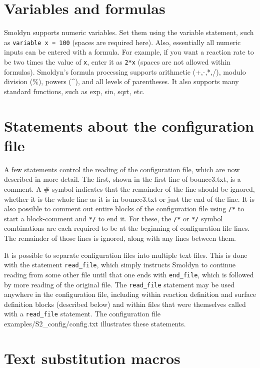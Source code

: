 \documentclass {scrbook}
\newcommand {\ttt} {\texttt}
\begin{document}
\section{Variables and formulas}

Smoldyn supports numeric variables. Set them using the variable statement, such as \ttt{variable x = 100} (spaces are required here). Also, essentially all numeric inputs can be entered with a formula. For example, if you want a reaction rate to be two times the value of \ttt{x}, enter it as \ttt{2*x} (spaces are not allowed within formulas). Smoldyn's formula processing supports arithmetic (+,-,*,/), modulo division (\%), powers (\^{}), and all levels of parentheses. It also supports many standard functions, such as exp, sin, sqrt, etc.

\section{Statements about the configuration file}

A few statements control the reading of the configuration file, which are now described in more detail. The first, shown in the first line of bounce3.txt, is a comment. A \# symbol indicates that the remainder of the line should be ignored, whether it is the whole line as it is in bounce3.txt or just the end of the line. It is also possible to comment out entire blocks of the configuration file using \ttt{/*} to start a block-comment and \ttt{*/} to end it. For these, the \ttt{/*} or \ttt{*/} symbol combinations are each required to be at the beginning of configuration file lines. The remainder of those lines is ignored, along with any lines between them.

It is possible to separate configuration files into multiple text files. This is done with the statement \ttt{read\_file}, which simply instructs Smoldyn to continue reading from some other file until that one ends with \ttt{end\_file}, which is followed by more reading of the original file. The \ttt{read\_file} statement may be used anywhere in the configuration file, including within reaction definition and surface definition blocks (described below) and within files that were themselves called with a \ttt{read\_file} statement. The configuration file examples/S2\_config/config.txt illustrates these statements.

\section{Text substitution macros}
\end{document}
